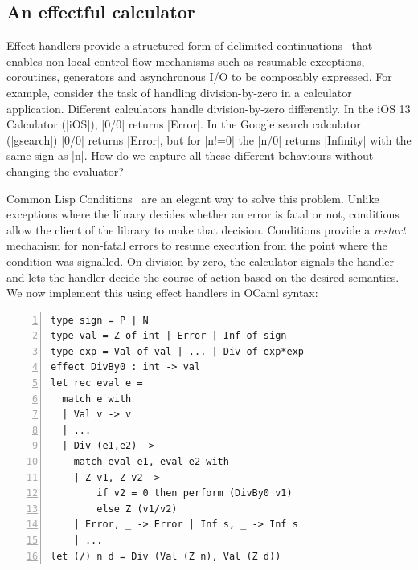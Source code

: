 \documentclass[sigplan,10pt,review,anonymous]{acmart}\settopmatter{printfolios=true,printccs=false,printacmref=false}
\begin{document}
\subsection{An effectful calculator}

Effect handlers provide a structured
form of delimited continuations~\cite{Danvy90} that enables
non-local control-flow mechanisms such as resumable exceptions, coroutines,
generators and asynchronous I/O to be composably expressed. For example,
consider the task of handling division-by-zero in a calculator
application. Different calculators handle division-by-zero differently. In the
iOS 13 Calculator (|iOS|), |0/0| returns |Error|. In the Google
search calculator (|gsearch|) |0/0| returns |Error|, but for
|n!=0| the |n/0| returns |Infinity| with the same sign as |n|.
How do we capture all these different behaviours without changing the evaluator?

Common Lisp Conditions~\cite{Steele90} are an elegant way to solve this
problem. Unlike exceptions where the library decides whether an error is fatal
or not, conditions allow the client of the library to make that decision.
Conditions provide a \emph{restart} mechanism for non-fatal errors to resume
execution from the point where the condition was signalled. On
division-by-zero, the calculator signals the handler and lets the handler
decide the course of action based on the desired semantics. We now implement
this using effect handlers in OCaml syntax:

\begin{lstlisting}[numbers=left]
type sign = P | N
type val = Z of int | Error | Inf of sign
type exp = Val of val | ... | Div of exp*exp
effect DivBy0 : int -> val
let rec eval e =
  match e with
  | Val v -> v
  | ...
  | Div (e1,e2) ->
    match eval e1, eval e2 with
    | Z v1, Z v2 ->
        if v2 = 0 then perform (DivBy0 v1)
        else Z (v1/v2)
    | Error, _ -> Error | Inf s, _ -> Inf s
    | ...
let (/) n d = Div (Val (Z n), Val (Z d))
\end{lstlisting}
\end{document}
